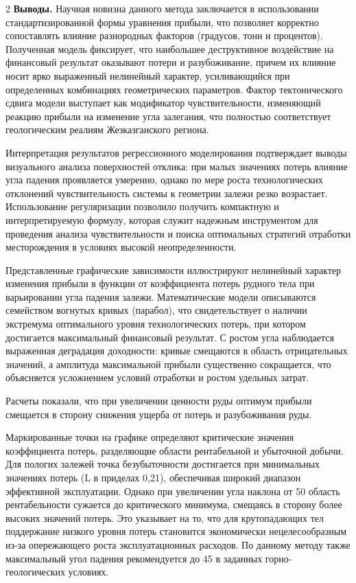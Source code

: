 \begin{multicols}{2}
{\bfseries Выводы.} Научная новизна данного метода заключается в
использовании стандартизированной формы уравнения прибыли, что позволяет
корректно сопоставлять влияние разнородных факторов (градусов, тонн и
процентов). Полученная модель фиксирует, что наибольшее деструктивное
воздействие на финансовый результат оказывают потери и разубоживание,
причем их влияние носит ярко выраженный нелинейный характер,
усиливающийся при определенных комбинациях геометрических параметров.
Фактор тектонического сдвига модели выступает как модификатор
чувствительности, изменяющий реакцию прибыли на изменение угла
залегания, что полностью соответствует геологическим реалиям
Жезказганского региона.

Интерпретация результатов регрессионного моделирования подтверждает
выводы визуального анализа поверхностей отклика: при малых значениях
потерь влияние угла падения проявляется умеренно, однако по мере роста
технологических отклонений чувствительность системы к геометрии залежи
резко возрастает. Использование регуляризации позволило получить
компактную и интерпретируемую формулу, которая служит надежным
инструментом для проведения анализа чувствительности и поиска
оптимальных стратегий отработки месторождения в условиях высокой
неопределенности.

Представленные графические зависимости иллюстрируют нелинейный характер
изменения прибыли в функции от коэффициента потерь рудного тела при
варьировании угла падения залежи. Математические модели описываются
семейством вогнутых кривых (парабол), что свидетельствует о наличии
экстремума оптимального уровня технологических потерь, при котором
достигается максимальный финансовый результат. С ростом угла наблюдается
выраженная деградация доходности: кривые смещаются в область
отрицательных значений, а амплитуда максимальной прибыли существенно
сокращается, что объясняется усложнением условий отработки и ростом
удельных затрат.

Расчеты показали, что при увеличении ценности руды оптимум прибыли
смещается в сторону снижения ущерба от потерь и разубоживания руды.

Маркированные точки на графике определяют критические значения
коэффициента потерь, разделяющие области рентабельной и убыточной
добычи. Для пологих залежей точка безубыточности достигается при
минимальных значениях потерь (L в приделах 0,21), обеспечивая широкий
диапазон эффективной эксплуатации. Однако при увеличении угла наклона от
50 область рентабельности сужается до критического
минимума, смещаясь в сторону более высоких значений потерь. Это
указывает на то, что для крутопадающих тел поддержание низкого уровня
потерь становится экономически нецелесообразным из-за опережающего роста
эксплуатационных расходов. По данному методу также максимальный угол
падения рекомендуется до 45 в заданных
горно-геологических условиях.
\end{multicols}

